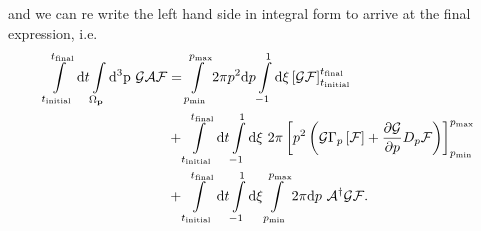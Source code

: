 \documentclass[preprint,aip]{revtex4-2}
\begin{document}
and we can re write the left hand side in integral form to arrive at the final expression, i.e.
\begin{equation}\label{eq:AFP13}
\begin{aligned}
\int\displaylimits_{t_\mathrm{initial}}^{t_\mathrm{final}}\mathrm{d}t
\int\displaylimits_{\Omega_\mathbf{p}}\mathrm{d^3p} \ \mathcal{GAF}
 &= \int\displaylimits_{p_\mathrm{min}}^{p_\mathrm{max}}2\pi p^2 \mathrm{d}p
	\int\displaylimits_{-1}^{1}\mathrm{d}\xi \left[\mathcal{GF}\right]_{t_\mathrm{initial}}^{t_\mathrm{final}} \\
	&+ \int\displaylimits_{t_\mathrm{initial}}^{t_\mathrm{final}}\mathrm{d}t
\int\displaylimits_{-1}^{1}\mathrm{d}\xi \ 2\pi
	\left[p^2\left(\mathcal{G}\Gamma_p\left[\mathcal{F}\right] + \frac{\partial\mathcal{G}}{\partial p}D_p\mathcal{F}\right)\right]_{p_\mathrm{min}}^{p_\mathrm{max}} \\
	&+ \int\displaylimits_{t_\mathrm{initial}}^{t_\mathrm{final}}\mathrm{d}t
\int\displaylimits_{-1}^{1}\mathrm{d}\xi
\int\displaylimits_{p_\mathrm{min}}^{p_\mathrm{max}}2\pi \mathrm{d}p \ \mathcal{A}^\dagger\mathcal{GF}.
\end{aligned}
\end{equation}
\end{document}
